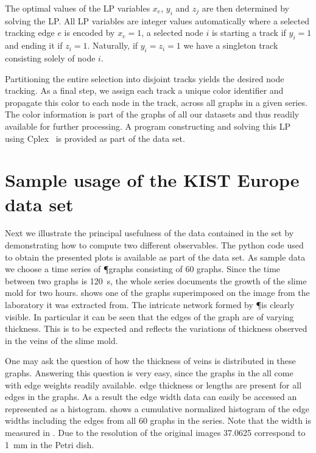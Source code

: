 		The optimal values of the LP variables $x_e$, $y_i$ and $z_j$ are then determined by solving the LP. All LP variables are integer values automatically where a selected tracking edge $e$ is encoded by $x_e=1$, a selected node $i$ is starting a track if $y_i=1$ and ending it if $z_i=1$. Naturally, if $y_i=z_i=1$ we have a singleton track consisting solely of node $i$.

		Partitioning the entire selection into disjoint tracks yields the desired node tracking. As a final step, we assign each track a unique color identifier and propagate this color to each node in the track, \ie across all graphs in a given series. The color information is part of the graphs of all our datasets and thus readily available for further processing. A program constructing and solving this LP using Cplex~\cite{cplex2005high} is provided as part of the data set.

\section{Sample usage of the KIST Europe data set}

	Next we illustrate the principal usefulness of the data contained in the \data set by demonstrating how to compute two different observables. The python code used to obtain the presented plots is available as part of the data set. As sample data we choose a time series of \P graphs consisting of $60$ graphs. Since the time between two graphs is \SI{120}{\second}, the whole series documents the growth of the slime mold for two hours.  shows one of the graphs superimposed on the image from the laboratory it was extracted from. The intricate network formed by \P is clearly visible. In particular it can be seen that the edges of the graph are of varying thickness. This is to be expected and reflects the variations of thickness observed in the veins of the slime mold. 

	One may ask the question of how the thickness of veins is distributed in these graphs. Answering this question is very easy, since the graphs in the \data all come with edge weights readily available. \ie edge thickness or lengths are present for all edges in the graphs. As a result the edge width data can easily be accessed an represented as a histogram.  shows a cumulative normalized histogram of the edge widths including the edges from all $60$ graphs in the series. Note that the width is measured in \si{\pixel}. Due to the resolution of the original images \SI{37.0625}{\pixel} correspond to \SI{1}{\milli\metre} in the Petri dish.

